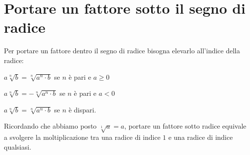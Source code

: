 \section{Portare un fattore sotto il segno di radice}
\label{sec:radici_portare_dentro}

Per portare un fattore dentro il segno di radice bisogna elevarlo all'indice 
della radice:
\begin{itemize*}
 \item $a\sqrt[n]b=\sqrt[n]{a^n\cdot b}$ se $n$ è pari e $a\ge 0$
 \item $a\sqrt[n]b=-\sqrt[n]{a^n\cdot b}$ se $n$ è pari e $a<0$
 \item $a\sqrt[n]b=\sqrt[n]{a^n\cdot b}$ se $n$ è dispari.
\end{itemize*}

Ricordando che abbiamo posto $\sqrt[1]a=a$, portare un fattore sotto radice 
equivale a svolgere la moltiplicazione tra una radice di indice $1$ e una 
radice di indice qualsiasi.
